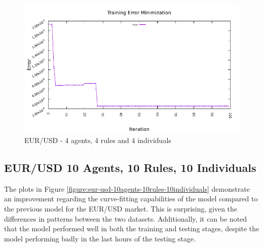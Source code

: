\begin{figure}[htp]
  \medskip

  \includegraphics[width=.45\textwidth]{img/plots/eur_usd_h1-4agents-4rules-4ind-100gen_error_minimization.pdf}

  \caption{EUR/USD - 4 agents, 4 rules and 4 individuals}
  \label{figure:eur-usd-4agents-4rules-4individuals}
\end{figure}

\newpage

\subsection{EUR/USD 10 Agents, 10 Rules, 10 Individuals}
\label{results:forecast-eur-usd-10agents-10rules-10individuals}

The plots in Figure \ref{figure:eur-usd-10agents-10rules-10individuals} demonstrate an improvement regarding the curve-fitting capabilities of the model compared to the previous model for the EUR/USD market. This is surprising, given the differences in patterns between the two datasets. Additionally, it can be noted that the model performed well in both the training and testing stages, despite the model performing badly in the last hours of the testing stage.

